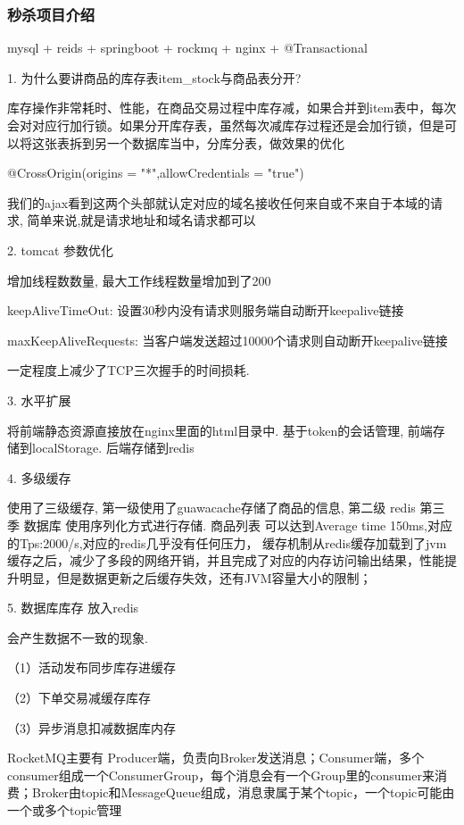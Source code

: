 \documentclass[UTF8]{ctexart}
\begin{document}
\subsubsection{秒杀项目介绍}

mysql + reids + springboot + rockmq + nginx + @Transactional

1. 为什么要讲商品的库存表item\_stock与商品表分开?

库存操作非常耗时、性能，在商品交易过程中库存减，如果合并到item表中，每次会对对应行加行锁。如果分开库存表，虽然每次减库存过程还是会加行锁，但是可以将这张表拆到另一个数据库当中，分库分表，做效果的优化


@CrossOrigin(origins = {"*"},allowCredentials = "true")

我们的ajax看到这两个头部就认定对应的域名接收任何来自或不来自于本域的请求, 简单来说,就是请求地址和域名请求都可以

2. tomcat 参数优化

增加线程数数量, 最大工作线程数量增加到了200

keepAliveTimeOut:  设置30秒内没有请求则服务端自动断开keepalive链接

maxKeepAliveRequests: 当客户端发送超过10000个请求则自动断开keepalive链接

一定程度上减少了TCP三次握手的时间损耗.

3. 水平扩展

将前端静态资源直接放在nginx里面的html目录中. 基于token的会话管理, 前端存储到localStorage. 后端存储到redis


4. 多级缓存

使用了三级缓存, 第一级使用了guawacache存储了商品的信息, 第二级 redis 第三季 数据库
使用序列化方式进行存储. 商品列表 可以达到Average time 150ms,对应的Tps:2000/s,对应的redis几乎没有任何压力，
缓存机制从redis缓存加载到了jvm缓存之后，减少了多段的网络开销，并且完成了对应的内存访问输出结果，性能提升明显，但是数据更新之后缓存失效，还有JVM容量大小的限制；

5. 数据库库存 放入redis

会产生数据不一致的现象.

（1）活动发布同步库存进缓存

（2）下单交易减缓存库存

（3）异步消息扣减数据库内存

RocketMQ主要有 Producer端，负责向Broker发送消息；Consumer端，多个consumer组成一个ConsumerGroup，每个消息会有一个Group里的consumer来消费；Broker由topic和MessageQueue组成，消息隶属于某个topic，一个topic可能由一个或多个topic管理
\end{document}
